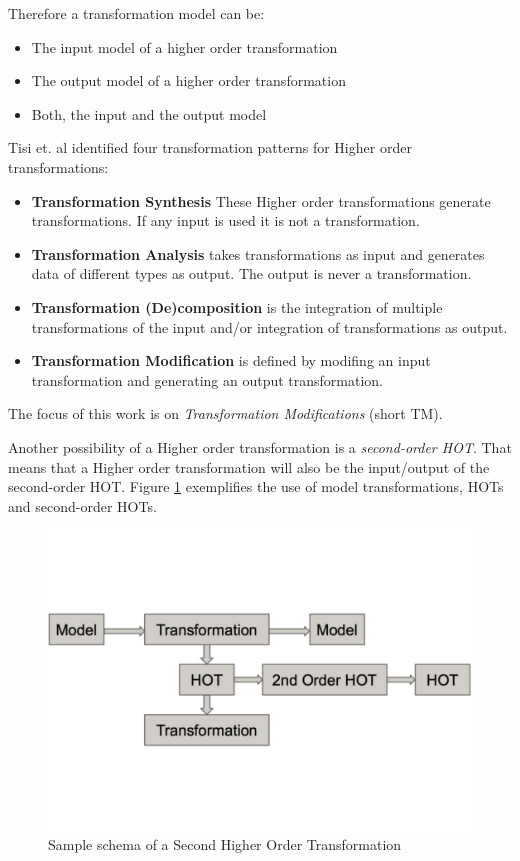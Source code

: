 \documentclass{llncs}
\begin{document}
Therefore a transformation model can be:

\begin{itemize}
	\item The input model of a higher order transformation
	\item The output model of a higher order transformation
	\item Both, the input and the output model
\end{itemize}

Tisi et. al \cite{Tisi:2009} identified four transformation patterns for Higher
order transformations:

\begin{itemize}
	\item \textbf{Transformation Synthesis} These Higher order transformations
	generate transformations. If any input is used it is not a transformation.
	\item \textbf{Transformation Analysis} takes transformations as input and generates data of different types as output. The output is never a transformation.
	\item \textbf{Transformation (De)composition} is the integration of multiple transformations of the input and/or integration of transformations as output.
	\item \textbf{Transformation Modification} is defined by modifing an input transformation and generating an output transformation.
\end{itemize}

The focus of this work is on \textit{Transformation Modifications} (short TM). 

Another possibility of a Higher order transformation is a \textit{second-order HOT}. That means that a Higher order transformation will also be the
input/output of the second-order HOT. Figure \ref{fig:second_order} exemplifies
the use of model transformations, HOTs and second-order HOTs.

\begin{figure}
	\centering
	\includegraphics[width=1\textwidth,natwidth=610,natheight=642]{figures/SecondOrderHOT.pdf}
	\caption{Sample schema of a Second Higher Order
	Transformation}
	\label{fig:second_order}
\end{figure}
\end{document}
